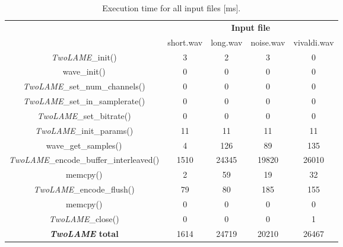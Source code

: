 \begin{table}[H]
    \centering
    \begin{tabular}{c|c|c|c|c|}
    \cline{2-5}
    \multicolumn{1}{c|}{}  & \multicolumn{4}{c|}{\textbf{Input file}} \\
    \cline{2-5}
     & short.wav & long.wav & noise.wav & vivaldi.wav \\
    \hline
    \multicolumn{1}{|c|}{\textit{TwoLAME}\_init()}  & 3 & 2 & 3 & 0 \\ 
    \hline
    \multicolumn{1}{|c|}{wave\_init()}  & 0 & 0 & 0 & 0 \\ 
    \hline
    \multicolumn{1}{|c|}{\textit{TwoLAME}\_set\_num\_channels()}   & 0 & 0 & 0 & 0 \\ 
    \hline
    \multicolumn{1}{|c|}{\textit{TwoLAME}\_set\_in\_samplerate()}   & 0 & 0 & 0 & 0 \\ 
    \hline
    \multicolumn{1}{|c|}{\textit{TwoLAME}\_set\_bitrate()}   & 0 & 0 & 0 & 0 \\ 
    \hline
    \multicolumn{1}{|c|}{\textit{TwoLAME}\_init\_params()}   & 11 & 11 & 11 & 11 \\ 
    \hline
    \multicolumn{1}{|c|}{wave\_get\_samples()}   & 4 & 126 & 89 & 135 \\ 
    \hline
    \multicolumn{1}{|c|}{\textit{TwoLAME}\_encode\_buffer\_interleaved()}   & 1510 & 24345 & 19820 & 26010 \\ 
    \hline
    \multicolumn{1}{|c|}{memcpy()}  & 2 & 59 & 19 & 32 \\ 
    \hline
    \multicolumn{1}{|c|}{\textit{TwoLAME}\_encode\_flush()}   & 79 & 80 & 185 & 155 \\ 
    \hline
    \multicolumn{1}{|c|}{memcpy()}  & 0 & 0 & 0 & 0 \\ 
    \hline
    \multicolumn{1}{|c|}{\textit{TwoLAME}\_close()}   & 0 & 0 & 0 & 1 \\ 
    \hline
    \multicolumn{1}{|c|}{\textbf{\textit{TwoLAME} total}}  & 1614 & 24719 & 20210 & 26467 \\ 
    \hline
    \end{tabular}
    \caption{Execution time for all input files [ms].}
    \label{profiling1}
\end{table}

\vspace{1cm}


